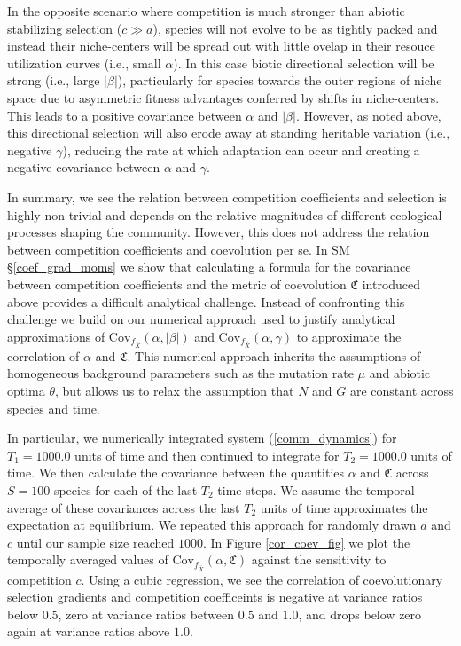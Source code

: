 \documentclass[]{article}
\begin{document}
In the opposite scenario where competition is much stronger than abiotic
stabilizing selection (\(c\gg a\)), species will not evolve to be as
tightly packed and instead their niche-centers will be spread out with
little ovelap in their resouce utilization curves (i.e., small
\(\alpha\)). In this case biotic directional selection will be strong
(i.e., large \(|\beta|\)), particularly for species towards the outer
regions of niche space due to asymmetric fitness advantages conferred by
shifts in niche-centers. This leads to a positive covariance between
\(\alpha\) and \(|\beta|\). However, as noted above, this directional
selection will also erode away at standing heritable variation (i.e.,
negative \(\gamma\)), reducing the rate at which adaptation can occur
and creating a negative covariance between \(\alpha\) and \(\gamma\).

In summary, we see the relation between competition coefficients and
selection is highly non-trivial and depends on the relative magnitudes
of different ecological processes shaping the community. However, this
does not address the relation between competition coefficients and
coevolution per se. In SM \S\ref{coef_grad_moms} we show that
calculating a formula for the covariance between competition
coefficients and the metric of coevolution \(\mathfrak{C}\) introduced
above provides a difficult analytical challenge. Instead of confronting
this challenge we build on our numerical approach used to justify
analytical approximations of
\(\mathrm{Cov}_{f_{\bar X}}(\alpha,|\beta|)\) and
\(\mathrm{Cov}_{f_{\bar X}}(\alpha,\gamma)\) to approximate the
correlation of \(\alpha\) and \(\mathfrak{C}\). This numerical approach
inherits the assumptions of homogeneous background parameters such as
the mutation rate \(\mu\) and abiotic optima \(\theta\), but allows us
to relax the assumption that \(N\) and \(G\) are constant across species
and time.

In particular, we numerically integrated system (\ref{comm_dynamics})
for \(T_1=1000.0\) units of time and then continued to integrate for
\(T_2=1000.0\) units of time. We then calculate the covariance between
the quantities \(\alpha\) and \(\mathfrak{C}\) across \(S=100\) species
for each of the last \(T_2\) time steps. We assume the temporal average
of these covariances across the last \(T_2\) units of time approximates
the expectation at equilibrium. We repeated this approach for randomly
drawn \(a\) and \(c\) until our sample size reached \(1000\). In Figure
\ref{cor_coev_fig} we plot the temporally averaged values of
\(\mathrm{Cov}_{f_{\bar X}}(\alpha,\mathfrak{C})\) against the
sensitivity to competition \(c\). Using a cubic regression, we see the
correlation of coevolutionary selection gradients and competition
coefficeints is negative at variance ratios below \(0.5\), zero at
variance ratios between \(0.5\) and \(1.0\), and drops below zero again
at variance ratios above \(1.0\).
\end{document}
